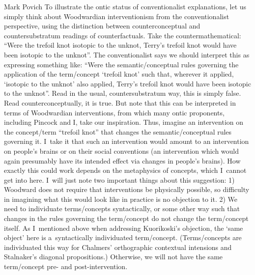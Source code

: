 \begin{artengenv}{Mark Povich}
To illustrate the ontic status of conventionalist explanations, let us simply think about Woodwardian
\parencite*[][]{woodward_making_2003} %
 interventionism from the conventionalist perspective, using the distinction between counterconceptual and countersubstratum readings of counterfactuals. Take the countermathematical: ``Were the trefoil knot isotopic to the unknot, Terry's trefoil knot would have been isotopic to the unknot''. The conventionalist says we should interpret this as expressing something like: ``Were the semantic/conceptual rules governing the application of the term/concept ‘trefoil knot' such that, wherever it applied, ‘isotopic to the unknot' also applied, Terry's trefoil knot would have been isotopic to the unknot''. Read in the usual, countersubstratum way, this is simply false. Read counterconceptually, it is true. But note that this can be interpreted in terms of Woodwardian interventions, from which many ontic proponents, including Pincock and I, take our inspiration. Thus, imagine an intervention on the concept/term ``trefoil knot'' that changes the semantic/conceptual rules governing it. I~take it that such an intervention would amount to an intervention on people's brains or on their social conventions (an intervention which would again presumably have its intended effect via changes in people's brains). How exactly this could work depends on the metaphysics of concepts, which I~cannot get into here. I~will just note two important things about this suggestion: 1) Woodward does not require that interventions be physically possible, so difficulty in imagining what this would look like in practice is no objection to it. 2) We need to individuate terms/concepts syntactically, or some other way such that changes in the rules governing the term/concept do not change the term/concept itself. As I~mentioned above when addressing Kuorikoski's objection, the ‘same object' here is a~syntactically individuated term/concept. (Terms/concepts are individuated this way for Chalmers' 
\parencite*[][pp.169–170]{chalmers_epistemic_2004} %
 orthographic contextual intensions and Stalnaker's 
\parencites*[][]{wittgenstein_remarks_1978}[][]{hale_reasons_2001} %
 diagonal propositions.) Otherwise, we will not have the same term/concept pre- and post-intervention.


\end{artengenv}
